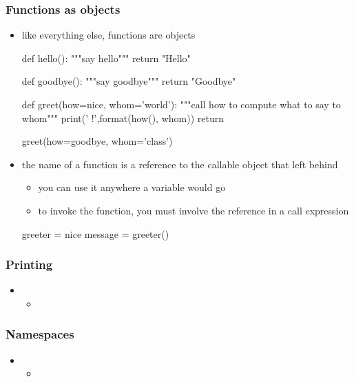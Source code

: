 \begin{frame}[fragile]
%
  \frametitle{Functions as objects}
%
  \begin{itemize}
%
  \item like everything else, functions are objects
    \begin{ipython}{}
      def hello():
          """say hello"""
          return "Hello"
      
      def goodbye():
          """say goodbye"""
          return "Goodbye"

      def greet(how=nice, whom='world'):
          """call {how} to compute what to say to {whom}"""
          print('{} {}!',format(how(), whom))
          return
          
      greet(how=goodbye, whom='class')
    \end{ipython}
%
  \item the name of a function is a reference to the callable object that  left
    behind
    \begin{itemize}
    \item you can use it anywhere a variable would go
    \item to invoke the function,  you must involve the reference in a call expression
    \end{itemize}
    \begin{ipython}{}
      greeter = nice
      message = greeter()
    \end{ipython}
%
  \end{itemize}
%
\end{frame}

\begin{frame}[fragile]
%
  \frametitle{Printing}
%
  \begin{itemize}
%
  \item 
    \begin{itemize}
    \item
    \end{itemize}
%
  \end{itemize}
%
\end{frame}

\begin{frame}[fragile]
%
  \frametitle{Namespaces}
%
  \begin{itemize}
%
  \item 
    \begin{itemize}
    \item
    \end{itemize}
%
  \end{itemize}
%
\end{frame}

